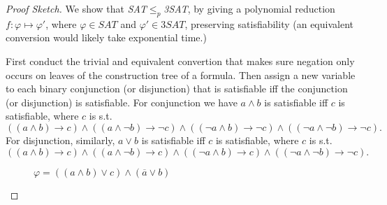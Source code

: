 \begin{proof}[Proof Sketch]
  We show that \textit{SAT}$\leq_p$\textit{3SAT}, by giving a polynomial reduction $f:\varphi\mapsto \varphi'$, where $\varphi\in \textit{SAT}$ and $\varphi'\in \textit{3SAT}$, preserving satisfiability (an equivalent conversion would likely take exponential time.)

  First conduct the trivial and equivalent convertion that makes sure negation only occurs on leaves of the construction tree of a formula. Then assign a new variable to each binary conjunction (or disjunction) that is satisfiable iff the conjunction (or disjunction) is satisfiable. For conjunction we have $a\wedge b$ is satisfiable iff $c$ is satisfiable, where $c$ is s.t.
  \[
    ((a\wedge b)\to c)\wedge((a\wedge \neg b)\to \neg c)\wedge ((\neg a\wedge b)\to \neg c)\wedge ((\neg a\wedge \neg b)\to \neg c).
  \]
  For disjunction, similarly, $a\vee b$ is satisfiable iff $c$ is satisfiable, where $c$ is s.t.
  \[
    ((a\wedge b)\to c)\wedge((a\wedge \neg b)\to c)\wedge ((\neg a\wedge b)\to c)\wedge ((\neg a\wedge \neg b)\to \neg c).
  \]
  \begin{figure}[H]
    \centering
    \caption{$\varphi=((a\wedge b)\vee c)\wedge(\overline{a}\vee b)$}
  \end{figure}


\end{proof}
